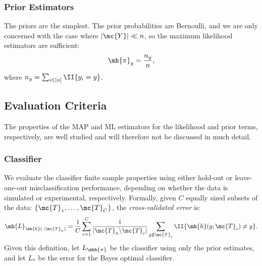 \documentclass[10pt,journal,cspaper,compsoc]{IEEEtran}
\begin{document}



\subsubsection{Prior Estimators} %
\label{sub:prior_estimators}

The priors are the simplest.  The prior probabilities are Bernoulli, and we are only concerned with the case where $|\mc{Y}| \ll n$, so the maximum likelihood estimators are sufficient:
\begin{align}
\mh{\pi}_y = \frac{n_y}{n},
\end{align}
where $n_y=\sum_{i \in [n]} \II\{y_i = y\}$.



\subsection{Evaluation Criteria} %
\label{sub:evaluation_criteria}

The properties of the MAP and ML estimators for the likelihood and prior terms, respectively, are well studied \cite{Bickel2000} and will therefore not be discussed in much detail.  


\subsubsection{Classifier} %
\label{ssub:classifier}

We evaluate the classifier finite sample properties using either hold-out or leave-one-out misclassification performance, depending on whether the data is simulated or experimental, respectively.  Formally, given $C$ equally sized subsets of the data: $\{\mc{T}_{1}, \ldots, \mc{T}_{C}\}$, the \emph{cross-validated error} is:
\begin{align} \label{eq:L2}
	\mh{L}_{\mh{h}(\cdot; \mc{T}_n)} = \frac{1}{C}\sum_{c=1}^C \frac{1}{|\mc{T}_n \backslash \mc{T}_c|}\sum_{g \notin \mc{T}_c} \II\{\mh{h}(g; \mc{T}_{c}) \neq y\}.
\end{align}
Given this definition, let $L_{\mhb{\pi}}$ be the classifier using only the prior estimates, and let $L_*$ be the error for the Bayes optimal classifier.  
\end{document}
